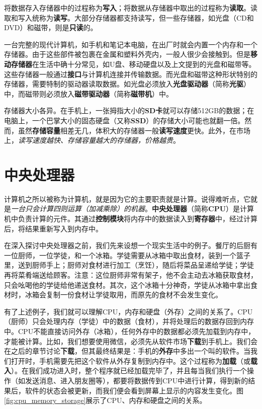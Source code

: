 将数据存入存储器中的过程称为\textbf{写入}；将数据从存储器中取出的过程称为\textbf{读取}。读取和写入统称为\textbf{读写}。大部分存储器都支持读写，但一些存储器，如光盘（CD和DVD）和磁带，则是\textbf{只读}的。

一台完整的现代计算机，如手机和笔记本电脑，在出厂时就会内置一个内存和一个存储器。由于这些部件被包裹在金属和塑料外壳内，一般人很少会接触到。但是\textbf{移动存储器}在生活中确十分常见，如U盘、移动硬盘以及上文提到的光盘和磁带等。这些存储器一般通过\textbf{接口}与计算机连接并传输数据。而光盘和磁带这种形状特别的存储器，需要特制的驱动器读取数据。如光盘必须放入\textbf{光盘驱动器}（简称\textbf{光驱}）中，而磁带则必须放入\textbf{磁带驱动器}（简称\textbf{磁带机}）中。

存储器大小各异。在手机上，一张拇指大小的\textbf{SD卡}就可以存储512GB的数据；在电脑上，一个巴掌大小的固态硬盘（又称\textbf{SSD}）的存储大小可能也就翻一倍。然而，虽然\textbf{存储容量}相差无几，体积大的存储器一般\textbf{读写速度}更快。此外，在市场上，\textit{读写速度越快、存储容量越大的存储器，价格越贵}。


\section{中央处理器}\label{sec:arch:cpu}

计算机之所以被称为计算机，就是因为它的主要职责就是计算。说得难听点，它就是\textit{一台只会计算四则运算（加减乘除）的机器}。\textbf{中央处理器}（简称\textbf{CPU}）是计算机中负责计算的元件。其通过\textbf{控制模块}将内存中的数据读入到\textbf{寄存器}中，经过计算后，将结果重新写入到内存中。

在深入探讨中央处理器之前，我们先来设想一个现实生活中的例子。餐厅的后厨有一位厨师，一位学徒，和一个冰箱。学徒需要从冰箱中取出食材，装到一个篮子里，送到厨师手上；厨师对食材进行加工（烹饪），随后将菜品呈递给学徒；学徒再将菜肴端送给顾客。注意：这位厨师非常有架子，他不会主动去冰箱获取食材，只会吆喝他的学徒给他递送食材。其次，这个冰箱十分神奇，学徒从冰箱中拿出食材时，冰箱会复制一份食材让学徒取用，而原先的食材不会发生变化。

有了上述例子，我们就可以理解CPU，内存和硬盘（外存）之间的关系了。CPU（厨师）只会处理内存（学徒）中的数据（食材），并将处理后的数据存回到内存中。CPU不能直接访问外存（冰箱），任何外存中的数据都必须先加载到内存中，才能被计算。比如，我们想要使用微信，必须先从软件市场\textbf{下载}到手机上。我们会在之后的章节讨论\textbf{下载}，但其最终结果是：手机的\textbf{外存}中多出一个叫的软件。当我们打开时，手机需要先把这个软件从外存复制到内存中。这个过程称为\textbf{加载}（或\textbf{载入}）。在我们成功进入时，整个程序就已经加载完毕了，并且每当我们执行一个操作（如发送消息、进入朋友圈等），都要将数据传到CPU中进行计算，得到新的结果后，软件的状态会被更新，而我们便会看到屏幕上显示的内容发生变化。图\ref{fig:cpu_memory_storage}展示了CPU、内存和硬盘之间的关系。


